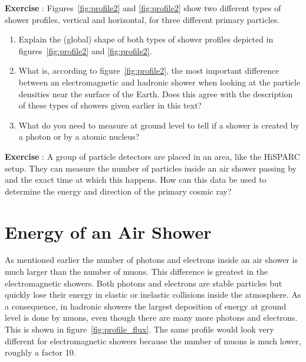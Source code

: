 \documentclass[12pt,a4paper]{article}
\numberwithin{equation}{section}
\numberwithin{figure}{section}
\newcounter{Exercise}
\numberwithin{table}{section}
\begin{document}
\begin{shaded}
\textbf{Exercise \theExercise {}} : Figures~\ref{fig:profile2} and \ref{fig:profile2} show two different types of shower profiles, vertical and horizontal, for three different primary particles.
\begin{enumerate}[-]
\item Explain the (global) shape of both types of shower profiles depicted in figures~\ref{fig:profile2} and \ref{fig:profile2}.
\item What is, according to figure~\ref{fig:profile2}, the most important difference between an electromagnetic and hadronic shower when looking at the particle densities near the surface of the Earth. Does this agree with the description of these types of showers given earlier in this text?
\item What do you need to measure at ground level to tell if a shower is created by a photon or by a atomic nucleus?
\end{enumerate}\end{shaded}

\begin{shaded}
\textbf{Exercise \theExercise {}} : A group of particle detectors are placed in an area, like the HiSPARC setup. They can measure the number of particles inside an air shower passing by and the exact time at which this happens. How can this data be used to determine the energy and direction of the primary cosmic ray?\end{shaded}

\section{Energy of an Air Shower}
As mentioned earlier the number of photons and electrons inside an air shower is much larger than the number of muons. This difference is greatest in the electromagnetic showers. Both photons and electrons are stable particles but quickly lose their energy in elastic or inelastic collisions inside the atmosphere. As a consequence, in hadronic showers the largest deposition of energy at ground level is done by muons, even though there are many more photons and electrons. This is shown in figure~\ref{fig:profile_flux}. The same profile would look very different for electromagnetic showers because the number of muons is much lower, roughly a factor 10.
\end{document}
